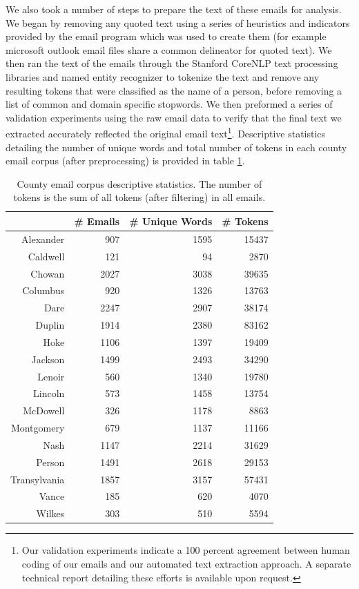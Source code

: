 \documentclass{pnastwo}
\begin{document}
\begin{article}
We also took a number of steps to prepare the text of these emails for analysis. We began by removing any quoted text using a series of heuristics and indicators provided by the email program which was used to create them (for example microsoft outlook email files share a common delineator for quoted text). We then ran the text of the emails through the Stanford CoreNLP text processing libraries \cite{manningetal2014} and named entity recognizer \cite{finkeletall2005} to tokenize the text and remove any resulting tokens that were classified as the name of a person, before removing a list of common and domain specific stopwords. We then preformed a series of validation experiments using the raw email data to verify that the final text we extracted accurately reflected the original email text\footnote{Our validation experiments indicate a 100 percent agreement between human coding of our emails and our automated text extraction approach. A separate technical report detailing these efforts is available upon request.}. Descriptive statistics detailing the number of unique words and total number of tokens in each county email corpus (after preprocessing) is provided in table \ref{tab:corpus desc stats}.  


\begin{table}
\centering
\begin{tabular}{rrrr}
  \toprule
 & \# Emails & \# Unique Words & \# Tokens  \\ 
  \midrule
Alexander & 907 & 1595 & 15437 \\ 
  Caldwell & 121 & 94 & 2870 \\ 
  Chowan & 2027 & 3038 & 39635  \\ 
  Columbus & 920 & 1326 & 13763  \\ 
  Dare & 2247 & 2907 & 38174  \\ 
  Duplin & 1914 & 2380 & 83162  \\ 
  Hoke & 1106 & 1397 & 19409 \\ 
  Jackson & 1499 & 2493 & 34290  \\ 
  Lenoir & 560 & 1340 & 19780  \\ 
  Lincoln & 573 & 1458 & 13754  \\ 
  McDowell & 326 & 1178 & 8863 \\ 
  Montgomery & 679 & 1137 & 11166  \\ 
  Nash & 1147 & 2214 & 31629  \\ 
  Person & 1491 & 2618 & 29153  \\
  Transylvania & 1857 & 3157 & 57431  \\ 
  Vance & 185 & 620 & 4070  \\ 
  Wilkes & 303 & 510 & 5594  \\
   \bottomrule
\end{tabular}
\caption{\label{tab:corpus desc stats} County email corpus descriptive statistics. The number of tokens is the sum of all tokens (after filtering) in all emails.}
\end{table}



\end{article}
\end{document}
